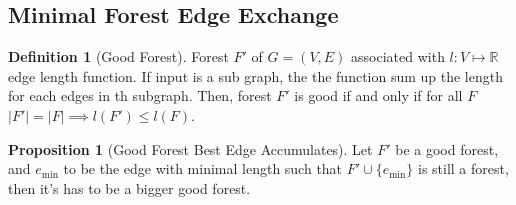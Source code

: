 \documentclass[]{article}
\theoremstyle{definition}
\newtheorem{prop}{Proposition}
\newtheorem{definition}{Definition}
\begin{document}
    \subsection{Minimal Forest Edge Exchange}
        \begin{definition}[Good Forest]
            Forest $F'$ of $G=(V, E)$ associated with $l:V \mapsto \mathbb R$ edge length function. If input is a sub graph, the the function sum up the length for each edges in th subgraph. Then, forest $F'$ is good if and only if for all $F$ $|F'| = |F|\implies l(F')\le l(F)$. 
        \end{definition}
        \begin{prop}[Good Forest Best Edge Accumulates]
            Let $F'$ be a good forest, and $e_{\min}$ to be the edge with minimal length such that $F'\cup \{e_{\min}\}$ is still a forest, then it's has to be a bigger good forest. 
        \end{prop}
\end{document}
